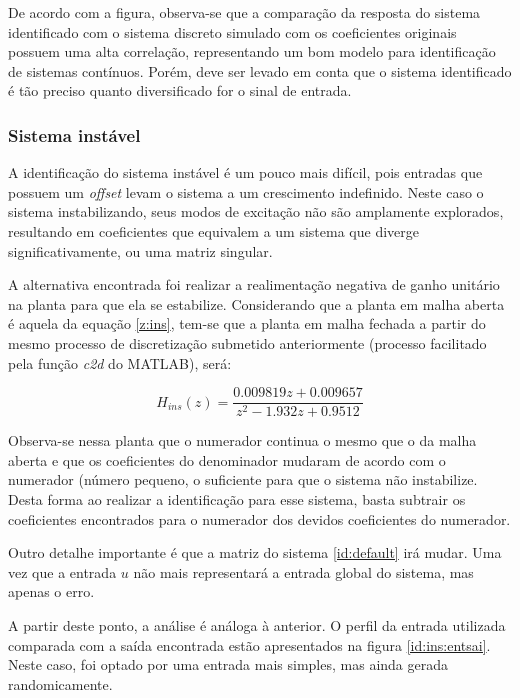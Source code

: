 De acordo com a figura, observa-se que a comparação da resposta do sistema identificado com o sistema discreto simulado com os coeficientes originais possuem uma alta correlação, representando um bom modelo para identificação de sistemas contínuos. Porém, deve ser levado em conta que o sistema identificado é tão preciso quanto diversificado for o sinal de entrada.

\subsubsection{Sistema instável}

A identificação do sistema instável é um pouco mais difícil, pois entradas que possuem um \textit{offset} levam o sistema a um crescimento indefinido. Neste caso o sistema instabilizando, seus modos de excitação não são amplamente explorados, resultando em coeficientes que equivalem a um sistema que diverge significativamente, ou uma matriz singular.

A alternativa encontrada foi realizar a realimentação negativa de ganho unitário na planta para que ela se estabilize. Considerando que a planta em malha aberta é aquela da equação \ref{z:ins}, tem-se que a planta em malha fechada a partir do mesmo processo de discretização submetido anteriormente (processo facilitado pela função \textit{c2d} do MATLAB), será:

\begin{equation} \label{z:ins:MF}
    H_{ins}(z) = \frac{0.009819 z + 0.009657}{z^2 - 1.932 z + 0.9512}
\end{equation}

Observa-se nessa planta que o numerador continua o mesmo que o da malha aberta e que os coeficientes do denominador mudaram de acordo com o numerador (número pequeno, o suficiente para que o sistema não instabilize. Desta forma ao realizar a identificação para esse sistema, basta subtrair os coeficientes encontrados para o numerador dos devidos coeficientes do numerador.

Outro detalhe importante é que a matriz do sistema \ref{id:default} irá mudar. Uma vez que a entrada $u$ não mais representará a entrada global do sistema, mas apenas o erro. 

A partir deste ponto, a análise é análoga à anterior. O perfil da entrada utilizada comparada com a saída encontrada estão apresentados na figura \ref{id:ins:entsai}. Neste caso, foi optado por uma entrada mais simples, mas ainda gerada randomicamente.

